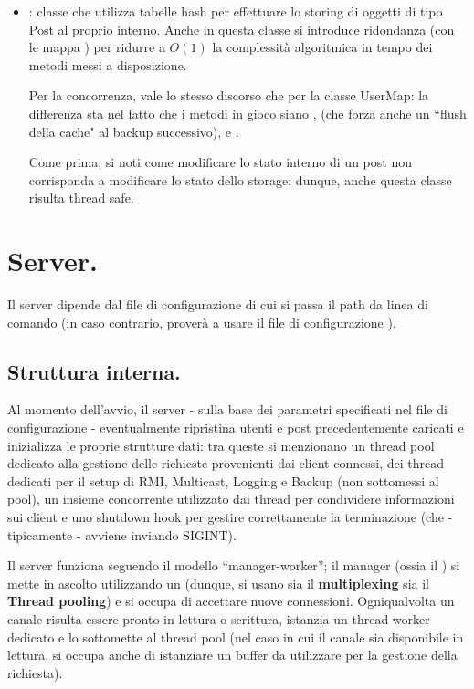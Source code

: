 \documentclass[11pt, italian, openany]{book}
\begin{document}
\begin{sloppypar}
\begin{itemize}[itemsep=0pt, parsep=0pt, topsep=0pt]
	Infine, si vada a notare come modificare lo stato interno di un certo utente non corrisponda a modificare lo stato dello
	storage: aggiungendo a questo la classe User sia thread safe, concludiamo che la classe \`e thread safe.
	\item {}: classe che utilizza tabelle hash per effettuare lo storing di oggetti di tipo Post al proprio interno.
	Anche in questa classe si introduce ridondanza (con le mappa ) per ridurre a \(O(1)\) la complessit\`a algoritmica
	in tempo dei metodi messi a disposizione.

	Per la concorrenza, vale lo stesso discorso che per la classe UserMap: la differenza sta nel fatto che i metodi in gioco siano
	,  (che forza anche un ``flush della cache" al backup successivo),  e
	.

	Come prima, si noti come modificare lo stato interno di un post non corrisponda a modificare lo stato dello storage: dunque,
	anche questa classe risulta thread safe.
\end{itemize}


\section{Server.}
Il server dipende dal file di configurazione di cui si passa il path da linea di comando (in caso
contrario, prover\`a a usare il file di configurazione ).

\subsection*{Struttura interna.}
Al momento dell'avvio, il server - sulla base dei parametri specificati nel file di configurazione - eventualmente ripristina utenti e post
precedentemente caricati e inizializza le proprie strutture dati: tra queste si menzionano un thread pool dedicato alla gestione delle
richieste provenienti dai client connessi, dei thread dedicati per il setup di RMI, Multicast, Logging e Backup
(non sottomessi al pool), un insieme concorrente utilizzato dai thread per condividere informazioni sui client e uno shutdown hook per
gestire correttamente la terminazione (che - tipicamente - avviene inviando SIGINT).

Il server funziona seguendo il modello ``manager-worker''; il manager (ossia il ) si mette in ascolto utilizzando un
 (dunque, si usano sia il \textbf{multiplexing} sia il \textbf{Thread pooling}) e si occupa di accettare nuove connessioni.
Ogniqualvolta un canale risulta essere pronto in lettura o scrittura, istanzia un thread worker dedicato e lo sottomette al thread
pool (nel caso in cui il canale sia disponibile in lettura, si occupa anche di istanziare un buffer da utilizzare per la gestione
della richiesta).


\end{sloppypar}
\end{document}
